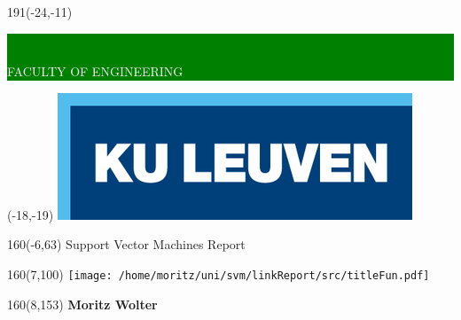 

\thispagestyle{empty}
\newcommand{\form}[1]{\scalebox{1.087}{\boldmath{#1}}}
\sffamily
%
\begin{textblock}{191}(-24,-11)
\colorbox{green}{\hspace{139mm}\ \parbox[c][18truemm]{60mm}{\textcolor{white}{FACULTY OF ENGINEERING}}}
\end{textblock}
%
\begin{textblock}{70}(-18,-19)
\textblockcolour{}
\includegraphics*[height=19.8truemm]{./src/LogoKULeuven}
\end{textblock}
%
\begin{textblock}{160}(-6,63)
\textblockcolour{}
\vspace{-\parskip}
\flushleft
\fontsize{40}{42}\selectfont \textcolor{bluetitle}{Support Vector Machines Report }\\[1.5mm]
\end{textblock}
%
\vspace{-\parskip}
\begin{textblock}{160}(7,100)
\texttt{[image: /home/moritz/uni/svm/linkReport/src/titleFun.pdf]}
\end{textblock}
%
\begin{textblock}{160}(8,153)
\textblockcolour{}
\vspace{-\parskip}
\flushright
\fontsize{14}{16}\selectfont \textbf{Moritz Wolter}
\end{textblock}
